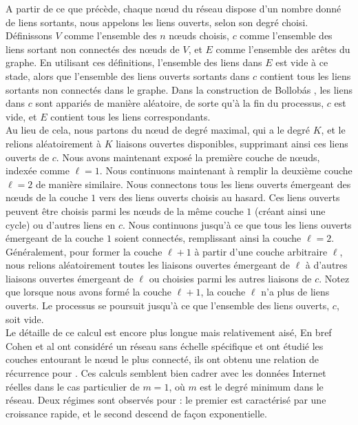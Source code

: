 A partir de ce que précède, chaque nœud du réseau dispose d'un nombre donné de liens sortants, nous appelons les liens ouverts, selon son degré choisi. Définissons $V$ comme l'ensemble des $n$ nœuds choisis, $c$ comme l'ensemble des liens sortant non connectés des nœuds de $V$, et $E$ comme l'ensemble des arêtes du graphe. En utilisant ces définitions, l'ensemble des liens dans $E$ est vide à ce stade, alors que l'ensemble des liens ouverts sortants dans $c$ contient tous les liens sortants non connectés dans le graphe. Dans la construction de Bollobás \cite{Bollobas1980}, les liens dans $c$ sont appariés de manière aléatoire, de sorte qu'à la fin du processus, $c$ est vide, et $E$ contient tous les liens correspondants.\\
Au lieu de cela,  nous partons du nœud de degré maximal, qui a le degré $K$, et le relions aléatoirement à $K$ liaisons ouvertes disponibles, supprimant ainsi ces liens ouverts de $c$. Nous avons maintenant exposé la première couche de nœuds, indexée comme $\ell=1$. Nous continuons maintenant à remplir la deuxième couche $\ell=2$ de manière similaire. Nous connectons tous les liens ouverts émergeant des nœuds de la couche $1$ vers des liens ouverts choisis au hasard. Ces liens ouverts peuvent être choisis parmi les nœuds de la même couche $1$ (créant ainsi une cycle) ou d'autres liens en $c$. Nous continuons jusqu'à ce que tous les liens ouverts émergeant de la couche $1$ soient connectés, remplissant ainsi la couche $\ell=2$. Généralement, pour former la couche $\ell+1$ à partir d'une couche arbitraire $\ell$, nous relions aléatoirement toutes les liaisons ouvertes émergeant de $\ell$ à d'autres liaisons ouvertes émergeant de $\ell$ ou choisies parmi les autres liaisons de $c$. Notez que lorsque nous avons formé la couche $\ell+1$, la couche $\ell$ n'a plus de liens ouverts. Le processus se poursuit jusqu'à ce que l'ensemble des liens ouverts, $c$, soit vide.\\
Le détaille de ce calcul est encore plus longue mais relativement aisé, En bref Cohen et al ont considéré un réseau sans échelle spécifique et ont étudié les couches entourant le nœud le plus connecté, ils ont obtenu une relation de récurrence pour \nl. Ces calculs semblent bien cadrer avec les données Internet réelles dans le cas particulier de $m=1$, où $m$ est le degré minimum dans le réseau. Deux régimes sont observés pour \nl: le premier est caractérisé par une croissance rapide, et le second descend de façon exponentielle.\\


